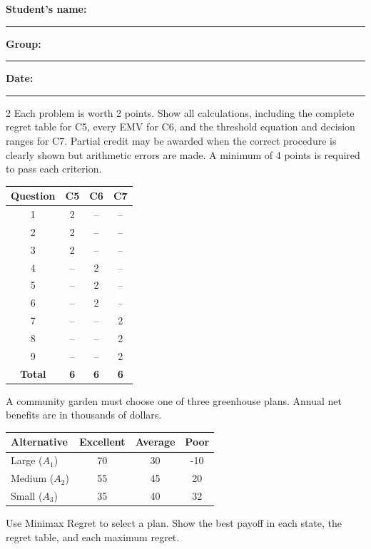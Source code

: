 	\vspace{0.1cm}
	\noindent
	\textbf{Student's name:} \rule{7cm}{0.4pt}\hfill
	\textbf{Group:} \rule{2cm}{0.4pt}\hfill
	\textbf{Date:} \rule{3cm}{0.4pt}

	\begin{multicols}{2}
		\raggedcolumns
		\vspace{-0.25cm}
		Each problem is worth 2 points. Show all calculations, including the complete regret table for C5, every EMV for C6, and the threshold equation and decision ranges for C7. Partial credit may be awarded when the correct procedure is clearly shown but arithmetic errors are made. A minimum of 4 points is required to pass each criterion.

		\begin{center}
			\begin{tabular}{|c|c|c|c|}
				\hline
				\textbf{Question} & \textbf{C5} & \textbf{C6} & \textbf{C7} \\ \hline
				1 & 2 & -- & -- \\ \hline
				2 & 2 & -- & -- \\ \hline
				3 & 2 & -- & -- \\ \hline
				4 & -- & 2 & -- \\ \hline
				5 & -- & 2 & -- \\ \hline
				6 & -- & 2 & -- \\ \hline
				7 & -- & -- & 2 \\ \hline
				8 & -- & -- & 2 \\ \hline
				9 & -- & -- & 2 \\ \hline
				\textbf{Total} & \textbf{6} & \textbf{6} & \textbf{6} \\ \hline
			\end{tabular}
		\end{center}

		\columnbreak

		A community garden must choose one of three greenhouse plans. Annual net benefits are in thousands of dollars.
		\begin{center}\small\setlength{\tabcolsep}{3pt}\renewcommand{\arraystretch}{1.15}
			\begin{tabular}{lccc}\toprule
			Alternative & Excellent & Average & Poor\\ \midrule
			Large ($A_1$)&70&30&-10\\
			Medium ($A_2$)&55&45&20\\
			Small ($A_3$)&35&40&32\\ \bottomrule
			\end{tabular}
		\end{center}
		Use Minimax Regret to select a plan. Show the best payoff in each state, the regret table, and each maximum regret.


\end{multicols}
